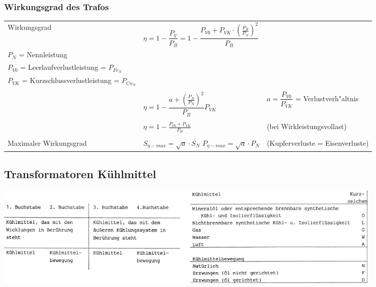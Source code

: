 		
		\subsubsection{Wirkungsgrad des Trafos}
			\begin{tabular}{p{4.5cm}p{7cm}p{7.5cm}}
            	Wirkungsgrad &
            		$\eta = 1- \dfrac{P_V}{P_B} = 1-\dfrac{P_{V0} + P_{VK} \cdot
            		(\frac{P_B}{P_N})^2}{P_B} $ &
            	\begin{minipage}{7cm}
                	$P_B$ = Betriebsnennleistung = $P_1$\\
                	$P_{N}$ = Nennleistung\\
                	$P_{V0}$ = Leerlaufverlustleistung = $P_{{Fe}_N}$\\
                	$P_{VK}$ = Kurzschlussverlustleistung = $P_{{Cu}_N}$             	
                \end{minipage}\\ \\
            	 &
            		$\eta = 1 - \dfrac{a + (\frac{P_B}{P_N})^2}{P_B} P_{VK}$ &
            	\begin{minipage}{7cm}
 					$a = \dfrac{P_{V0}}{P_{VK}}$ = Verlustverh"altnis                	
                \end{minipage}\\ \\            		
            	 &
            		$\eta = 1 - \frac{P_{V0}+P_{VK}}{P_B} $ 
            		& (bei Wirkleistungsvollast) \\ \\
            	Maximaler Wirkungsgrad
            	& $S_{\eta-max} = \sqrt{a} \cdot S_N$ \quad $P_{\eta-max} = \sqrt{a}
            	\cdot P_N$
            	& (Kupferverluste = Eisenverluste)
            \end{tabular}	

	\subsection{Transformatoren Kühlmittel}
		\begin{center}
	    	\includegraphics[width=19cm]{bilder/Kuehlmittel.png}
	    \end{center} 

